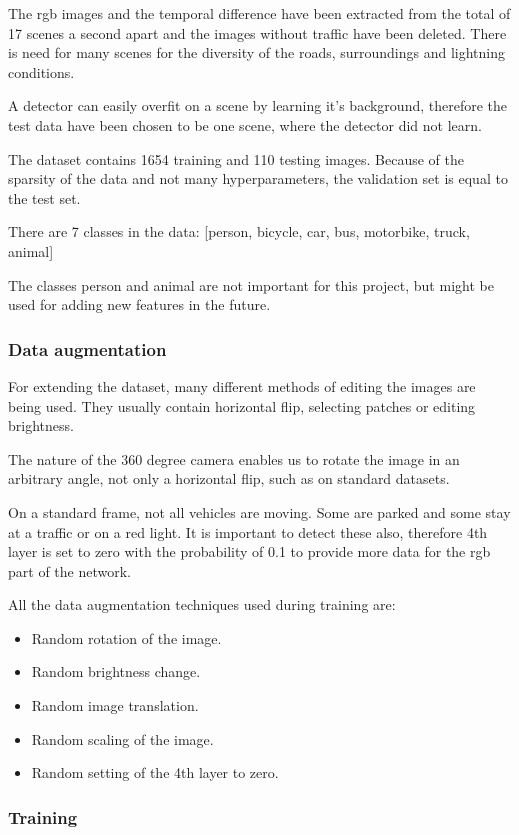 \documentclass[a4paper,12pt,titlepage]{article}
\numberwithin{figure}{section}
\begin{document}
The rgb images and the temporal difference have been extracted from the total of 17 scenes a second apart and the images without traffic have been deleted. There is need for many scenes for the diversity of the roads, surroundings and lightning conditions. 

A detector can easily overfit on a scene by learning it's background, therefore the test data have been chosen to be one scene, where the detector did not learn.

The dataset contains 1654 training and 110 testing images. Because of the sparsity of the data and not many hyperparameters, the validation set is equal to the test set.

There are 7 classes in the data: 
[person, bicycle, car, bus, motorbike, truck, animal]

The classes person and animal are not important for this project, but might be used for adding new features in the future.
\subsubsection{Data augmentation}
For extending the dataset, many different methods of editing the images are being used. They usually contain horizontal flip, selecting patches or editing brightness. 

The nature of the 360 degree camera enables us to rotate the image in an arbitrary angle, not only a horizontal flip, such as on standard datasets. 

On a standard frame, not all vehicles are moving. Some are parked and some stay at a traffic or on a red light. It is important to detect these also, therefore 4th layer is set to zero with the probability of 0.1 to provide more data for the rgb part of the network.

All the data augmentation techniques used during training are:

\begin{itemize}
\item Random rotation of the image.
\item Random brightness change.
\item Random image translation.
\item Random scaling of the image.
\item Random setting of the 4th layer to zero.
\end{itemize}

\subsubsection{Training}
\end{document}
